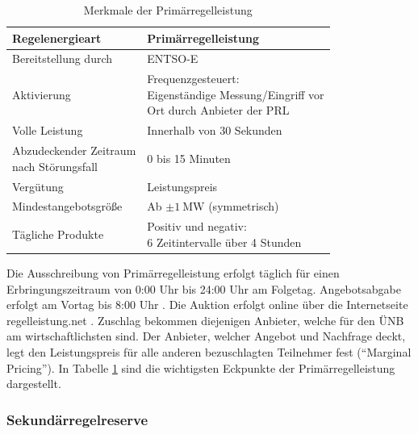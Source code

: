 			\begin{table}[H]
				\renewcommand*{\arraystretch}{1.75}
				\centering
				\caption{Merkmale der Primärregelleistung \cite{Regelleistung_NextKraftwerke}}
				\label{Tab. Merkmale der Primärregellung}
				\begin{tabular}{ll}
					\hline
					Regelenergieart & Primärregelleistung  \\ \hline
					Bereitstellung durch & ENTSO-E  \\
					Aktivierung & \makecell[l]{Frequenzgesteuert: \\ Eigenständige Messung/Eingriff vor \\ Ort durch Anbieter der PRL} \\
					Volle Leistung & Innerhalb von 30 Sekunden \\
					\makecell[l]{Abzudeckender Zeitraum \\ nach Störungsfall} & \num{0} bis \num{15} Minuten  \\
					Vergütung & Leistungspreis  \\
					Mindestangebotsgröße & Ab $\pm\SI{1}{\mega\watt}$ (symmetrisch) \\
					Tägliche Produkte & \makecell[l]{Positiv und negativ: \\ \num{6} Zeitintervalle über \num{4} Stunden} \\ \hline
				\end{tabular}
			\end{table}
			
			Die Ausschreibung von Primärregelleistung erfolgt täglich für einen Erbringungszeitraum von 0:00 Uhr bis 24:00 Uhr am Folgetag.
			Angebotsabgabe erfolgt am Vortag bis 8:00 Uhr  \parencite{regelleistungnet_PRL_Ausschreibung}.
			Die Auktion erfolgt online über die Internetseite regelleistung.net \parencite{regelleistungnet_PRL_Ausschreibung}.
			Zuschlag bekommen diejenigen Anbieter, welche für den ÜNB am wirtschaftlichsten sind.
			Der Anbieter, welcher Angebot und Nachfrage deckt, legt den Leistungspreis für alle anderen bezuschlagten Teilnehmer fest ("`Marginal Pricing"').
			In Tabelle \ref{Tab. Merkmale der Primärregellung} sind die wichtigsten Eckpunkte der Primärregelleistung dargestellt.		

		\subsubsection{Sekundärregelreserve}		
			
